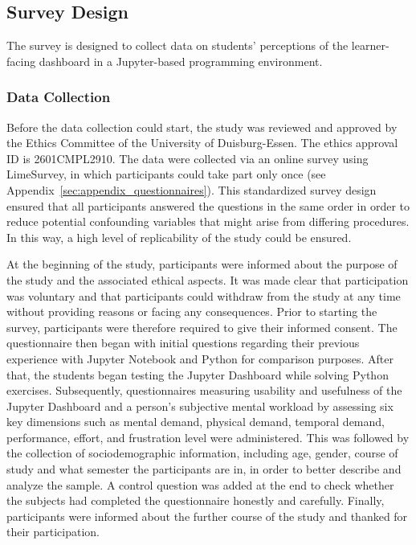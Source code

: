 \subsection{Survey Design}

The survey is designed to collect data on students' perceptions of the learner-facing dashboard in a Jupyter-based programming environment.

\subsubsection{Data Collection}

Before the data collection could start, the study was reviewed and approved by the Ethics Committee of the University of Duisburg-Essen. The ethics approval ID is 2601CMPL2910.
The data were collected via an online survey using LimeSurvey, in which participants could take part only once (see Appendix~\ref{sec:appendix_questionnaires}).
This standardized survey design ensured that all participants answered the questions in the same order in order to reduce potential confounding variables that might arise from differing procedures. In this way, a high level of replicability of the study could be ensured.

At the beginning of the study, participants were informed about the purpose of the study and the associated ethical aspects. It was made clear that participation was voluntary and that participants could withdraw from the study at any time without providing reasons or facing any consequences. Prior to starting the survey, participants were therefore required to give their informed consent. The questionnaire then began with initial questions regarding their previous experience with Jupyter Notebook and Python for comparison purposes. After that, the students began testing the Jupyter Dashboard while solving Python exercises.
Subsequently, questionnaires measuring usability and usefulness of the Jupyter Dashboard and a person's subjective mental workload by assessing six key dimensions such as mental demand, physical demand, temporal demand, performance, effort, and frustration level were administered.
This was followed by the collection of sociodemographic information, including age, gender, course of study and what semester the participants are in, in order to better describe and analyze the sample. A control question was added at the end to check whether the subjects had completed the questionnaire honestly and carefully. Finally, participants were informed about the further course of the study and thanked for their participation.

